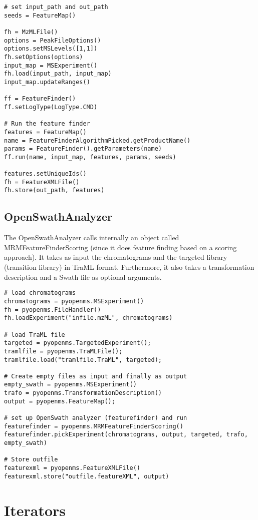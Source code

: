 \documentclass[10pt]{article}
\begin{document}
\begin{verbatim}
# set input_path and out_path
seeds = FeatureMap()

fh = MzMLFile()
options = PeakFileOptions()
options.setMSLevels([1,1])
fh.setOptions(options)
input_map = MSExperiment()
fh.load(input_path, input_map)
input_map.updateRanges()

ff = FeatureFinder()
ff.setLogType(LogType.CMD)

# Run the feature finder
features = FeatureMap()
name = FeatureFinderAlgorithmPicked.getProductName()
params = FeatureFinder().getParameters(name)
ff.run(name, input_map, features, params, seeds)

features.setUniqueIds()
fh = FeatureXMLFile()
fh.store(out_path, features)
\end{verbatim}

\subsection{OpenSwathAnalyzer}

The OpenSwathAnalyzer calls internally an object called
MRMFeatureFinderScoring (since it does feature finding based on a scoring
approach). It takes as input the chromatograms and the targeted library
(transition library) in TraML format. Furthermore, it also takes a
transformation description and a Swath file as optional arguments.

\begin{verbatim}
# load chromatograms
chromatograms = pyopenms.MSExperiment()
fh = pyopenms.FileHandler()
fh.loadExperiment("infile.mzML", chromatograms)

# load TraML file
targeted = pyopenms.TargetedExperiment();
tramlfile = pyopenms.TraMLFile();
tramlfile.load("tramlfile.TraML", targeted);

# Create empty files as input and finally as output
empty_swath = pyopenms.MSExperiment()
trafo = pyopenms.TransformationDescription()
output = pyopenms.FeatureMap();

# set up OpenSwath analyzer (featurefinder) and run
featurefinder = pyopenms.MRMFeatureFinderScoring()
featurefinder.pickExperiment(chromatograms, output, targeted, trafo, empty_swath)

# Store outfile
featurexml = pyopenms.FeatureXMLFile()
featurexml.store("outfile.featureXML", output)
\end{verbatim}

\section{Iterators}
\end{document}
